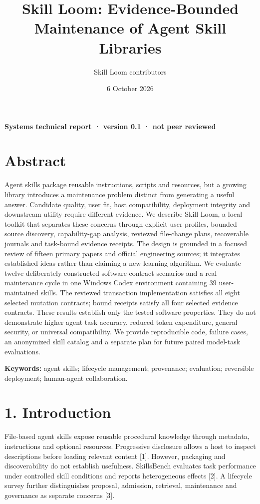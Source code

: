 \documentclass[
  11pt,
]{article}
\title{Skill Loom: Evidence-Bounded Maintenance of Agent Skill
Libraries}
\author{Skill Loom contributors}
\date{6 October 2026}
\begin{document}
\maketitle

\textbf{Systems technical report · version 0.1 · not peer reviewed}

\section{Abstract}\label{abstract}

Agent skills package reusable instructions, scripts and resources, but a
growing library introduces a maintenance problem distinct from
generating a useful answer. Candidate quality, user fit, host
compatibility, deployment integrity and downstream utility require
different evidence. We describe Skill Loom, a local toolkit that
separates these concerns through explicit user profiles, bounded source
discovery, capability-gap analysis, reviewed file-change plans,
recoverable journals and task-bound evidence receipts. The design is
grounded in a focused review of fifteen primary papers and official
engineering sources; it integrates established ideas rather than
claiming a new learning algorithm. We evaluate twelve deliberately
constructed software-contract scenarios and a real maintenance cycle in
one Windows Codex environment containing 39 user-maintained skills. The
reviewed transaction implementation satisfies all eight selected
mutation contracts; bound receipts satisfy all four selected evidence
contracts. These results establish only the tested software properties.
They do not demonstrate higher agent task accuracy, reduced token
expenditure, general security, or universal compatibility. We provide
reproducible code, failure cases, an anonymized skill catalog and a
separate plan for future paired model-task evaluations.

\textbf{Keywords:} agent skills; lifecycle management; provenance;
evaluation; reversible deployment; human-agent collaboration.

\section{1. Introduction}\label{introduction}

File-based agent skills expose reusable procedural knowledge through
metadata, instructions and optional resources. Progressive disclosure
allows a host to inspect descriptions before loading relevant content
{[}1{]}. However, packaging and discoverability do not establish
usefulness. SkillsBench evaluates task performance under controlled
skill conditions and reports heterogeneous effects {[}2{]}. A lifecycle
survey further distinguishes proposal, admission, retrieval, maintenance
and governance as separate concerns {[}3{]}.
\end{document}
